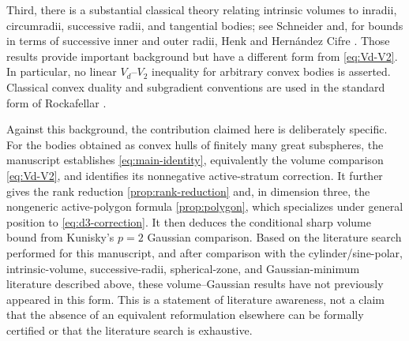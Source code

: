 \documentclass[10pt,reqno]{amsart}
\theoremstyle{definition}
\theoremstyle{remark}
\begin{document}
Third, there is a substantial classical theory relating intrinsic volumes to inradii, circumradii, successive radii, and tangential bodies; see Schneider \cite{Schneider} and, for bounds in terms of successive inner and outer radii, Henk and Hern\'andez Cifre \cite{HenkHernandez}. Those results provide important background but have a different form from \eqref{eq:Vd-V2}. In particular, no linear $V_d$--$V_2$ inequality for arbitrary convex bodies is asserted. Classical convex duality and subgradient conventions are used in the standard form of Rockafellar \cite{Rockafellar}.

Against this background, the contribution claimed here is deliberately specific. For the bodies obtained as convex hulls of finitely many great subspheres, the manuscript establishes \eqref{eq:main-identity}, equivalently the volume comparison \eqref{eq:Vd-V2}, and identifies its nonnegative active-stratum correction. It further gives the rank reduction \cref{prop:rank-reduction} and, in dimension three, the nongeneric active-polygon formula \cref{prop:polygon}, which specializes under general position to \eqref{eq:d3-correction}. It then deduces the conditional sharp volume bound from Kunisky's $p=2$ Gaussian comparison. Based on the literature search performed for this manuscript, and after comparison with the cylinder/sine-polar, intrinsic-volume, successive-radii, spherical-zone, and Gaussian-minimum literature described above, these volume--Gaussian results have not previously appeared in this form. This is a statement of literature awareness, not a claim that the absence of an equivalent reformulation elsewhere can be formally certified or that the literature search is exhaustive.
\end{document}
